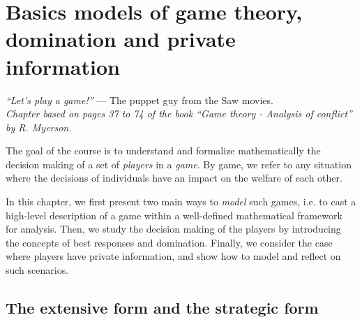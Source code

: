 \ifx \globalmark \undefined %
	
\else 	
\fi




\chapter{Basics models of game theory, domination and private information} \label{chap:Models}
{\large{\itshape
``Let's play a game!''} --- The puppet guy from the Saw movies.\\
}
{\small{\itshape
Chapter based on pages 37 to 74 of the book  ``Game theory - Analysis of conflict'' by R. Myerson.}\\
}



The goal of the course is to understand and formalize mathematically the decision making of a set of 
 \emph{players} in a 
 \emph{game}. 
 By game, 
 we refer to any situation
  where the decisions 
  of individuals have an impact 
  on the welfare of each other.
 
In this chapter, 
we first present two main ways to \emph{model}
 such games, i.e. to cast a high-level description of a game within a well-defined mathematical framework for analysis.
Then, we study the decision making of the
 players by introducing the concepts of best responses
  and domination.
Finally,
 we consider the case where players have private information,
  and show how to model and reflect on such scenarios.


\section{The extensive form and the strategic form}

